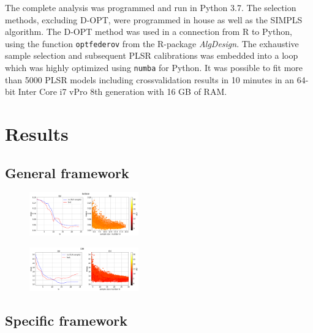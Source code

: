 \documentclass{article}
\begin{document}
The complete analysis was programmed and run in Python 3.7. The selection methods, excluding D-OPT, were programmed in house as well as the SIMPLS algorithm. The D-OPT method was used in a connection from R to Python, using the function \texttt{optfederov} from the R-package \emph{AlgDesign}. The exhaustive sample selection and subsequent PLSR calibrations was embedded into a loop which was highly optimized using \texttt{numba} for Python. It was possible to fit more than 5000 PLSR models including crossvalidation results in 10 minutes in an 64-bit Inter Core i7 vPro 8th generation with 16 GB of RAM. 


\section*{Results}\label{results}


\subsection*{General framework}\label{results:genframework}

\begin{figure}[b]
\includegraphics[width=0.42\textwidth]{manuscript/figures/d01_milk_general_framework.png}
\centering
\caption{}
\label{fig_d01_milk_general_framework}
\end{figure}

\begin{figure}[b]
\includegraphics[width=0.42\textwidth]{manuscript/figures/d02_manure_general_framework.png}
\centering
\caption{}
\label{fig_d02_manure_general_framework}
\end{figure}

\subsection*{Specific framework}\label{results:specframework}
\end{document}
